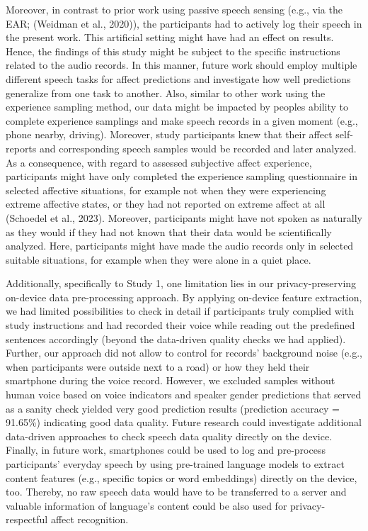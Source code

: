 \documentclass[
  english,
  man,floatsintext]{apa6}
\begin{document}
Moreover, in contrast to prior work using passive speech sensing (e.g., via the EAR; (Weidman et al., 2020)), the participants had to actively log their speech in the present work. This artificial setting might have had an effect on results. Hence, the findings of this study might be subject to the specific instructions related to the audio records. In this manner, future work should employ multiple different speech tasks for affect predictions and investigate how well predictions generalize from one task to another.
Also, similar to other work using the experience sampling method, our data might be impacted by peoples ability to complete experience samplings and make speech records in a given moment (e.g., phone nearby, driving). Moreover, study participants knew that their affect self-reports and corresponding speech samples would be recorded and later analyzed. As a consequence, with regard to assessed subjective affect experience, participants might have only completed the experience sampling questionnaire in selected affective situations, for example not when they were experiencing extreme affective states, or they had not reported on extreme affect at all (Schoedel et al., 2023). Moreover, participants might have not spoken as naturally as they would if they had not known that their data would be scientifically analyzed. Here, participants might have made the audio records only in selected suitable situations, for example when they were alone in a quiet place.

Additionally, specifically to Study 1, one limitation lies in our privacy-preserving on-device data pre-processing approach. By applying on-device feature extraction, we had limited possibilities to check in detail if participants truly complied with study instructions and had recorded their voice while reading out the predefined sentences accordingly (beyond the data-driven quality checks we had applied). Further, our approach did not allow to control for records' background noise (e.g., when participants were outside next to a road) or how they held their smartphone during the voice record. However, we excluded samples without human voice based on voice indicators and speaker gender predictions that served as a sanity check yielded very good prediction results (prediction accuracy = 91.65\%) indicating good data quality. Future research could investigate additional data-driven approaches to check speech data quality directly on the device. Finally, in future work, smartphones could be used to log and pre-process participants' everyday speech by using pre-trained language models to extract content features (e.g., specific topics or word embeddings) directly on the device, too. Thereby, no raw speech data would have to be transferred to a server and valuable information of language's content could be also used for privacy-respectful affect recognition.
\end{document}
